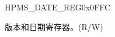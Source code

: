 \begin{register}{H}{PMS\_DATE\_REG}{0x0FFC}\label{regdesc:PMSDATEREG}
%
%
\regnewline%
\begin{regdesc}\begin{reglist}
\label{fielddesc:PMSDATE}\item [PMS\_DATE] 版本和日期寄存器。(R/W)
\end{reglist}\end{regdesc}
\end{register}
